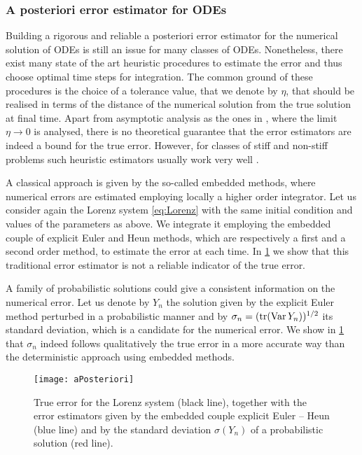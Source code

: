 \documentclass[10pt]{article}
\begin{document}
\subsubsection*{{A posteriori error estimator for ODEs}} Building a rigorous and reliable a posteriori error estimator for the numerical solution of ODEs is still an issue for many classes of ODEs. Nonetheless, there exist many state of the art heuristic procedures to estimate the error and thus choose optimal time steps for integration. The common ground of these procedures is the choice of a tolerance value, that we denote by $\eta$, that should be realised in terms of the distance of the numerical solution from the true solution at final time. Apart from asymptotic analysis as the ones in \cite{HiS98, LaS98}, where the limit $\eta \to 0$ is analysed, there is no theoretical guarantee that the error estimators are indeed a bound for the true error. However, for classes of stiff and non-stiff problems such heuristic estimators usually work very well \cite{HNW93, HaW96}.

A classical approach is given by the so-called embedded methods, where numerical errors are estimated employing locally a higher order integrator. Let us consider again the Lorenz system \eqref{eq:Lorenz} with the same initial condition and values of the parameters as above. We integrate it employing the embedded couple of explicit Euler and Heun methods, which are respectively a first and a second order method, to estimate the error at each time. In \cref{fig:aPosteriori} we show that this traditional error estimator is not a reliable indicator of the true error.

A family of probabilistic solutions could give a consistent information on the numerical error. Let us denote by $Y_n$ the solution given by the explicit Euler method perturbed in a probabilistic manner and by $\sigma_n = (\operatorname{tr}(\operatorname{Var} Y_n))^{1/2}$ its standard deviation, which is a candidate for the numerical error. We show in \cref{fig:aPosteriori} that $\sigma_n$ indeed follows qualitatively the true error in a more accurate way than the deterministic approach using embedded methods.

\begin{figure}
	\centering
	\texttt{[image: aPosteriori]}
	\caption{True error for the Lorenz system (black line), together with the error estimators given by the embedded couple explicit Euler -- Heun (blue line) and by the standard deviation $\sigma(Y_n)$ of a probabilistic solution (red line).}
	\label{fig:aPosteriori}
\end{figure}
\end{document}
